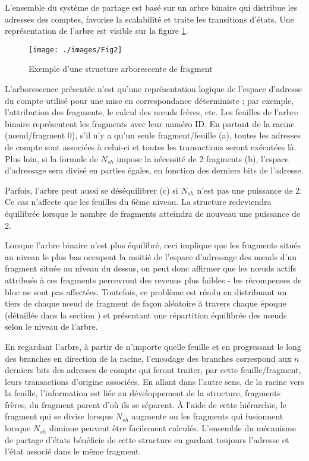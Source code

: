 \documentclass[journal]{IEEEtran}
\begin{document}
L'ensemble du système de partage est basé sur un arbre binaire qui distribue les adresses des comptes, favorise la scalabilité et traite les transitions d'états. Une représentation de l'arbre est visible sur la figure \ref{Fig.2}.

\begin{figure}
	\texttt{[image: ./images/Fig2]} %
	\caption{Exemple d'une structure arborescente de fragment} %
	\label{Fig.2} %
\end{figure}

L'arborescence présentée n'est qu'une représentation logique de l'espace d'adresse du compte utilisé pour une mise en correspondance déterministe ; par exemple, l'attribution des fragments, le calcul des nœuds frères, etc. Les feuilles de l'arbre binaire représentent les fragments avec leur numéro ID. En partant de la racine (nœud/fragment 0), s'il n'y a qu'un seule fragment/feuille (a), toutes les adresses de compte sont associées à celui-ci et toutes les transactions seront exécutées là. Plus loin, si la formule de ${N}_{sh}$ impose la nécessité de 2 fragments (b), l'espace d'adressage sera divisé en parties égales, en fonction des derniers bits de l'adresse.

Parfois, l'arbre peut aussi se déséquilibrer (c) si ${N}_{sh}$ n'est pas une puissance de 2. Ce cas n'affecte que les feuilles du 6ème niveau. La structure redeviendra équilibrée lorsque le nombre de fragments atteindra de nouveau une puissance de 2.

Lorsque l'arbre binaire n’est plus équilibré, ceci implique que les fragments situés au niveau le plus bas occupent la moitié de l'espace d'adressage des nœuds d'un fragment située au niveau du dessus, on peut donc affirmer que les nœuds actifs attribués à ces fragments percevront des revenus plus faibles - les récompenses de bloc ne sont pas affectées. Toutefois, ce problème est résolu en distribuant un tiers de chaque nœud de fragment de façon aléatoire à travers chaque époque (détaillée dans la section ) et présentant une répartition équilibrée des nœuds selon le niveau de l'arbre.

En regardant l'arbre, à partir de n'importe quelle feuille et en progressant le long des branches en direction de la racine, l'encodage des branches correspond aux $n$ derniers bits des adresses de compte qui feront traiter, par cette feuille/fragment, leurs transactions d'origine associées. En allant dans l'autre sens, de la racine vers la feuille, l'information est liée au développement de la structure, fragments frères, du fragment parent d'où ils se séparent. À l'aide de cette hiérarchie, le fragment qui se divise lorsque ${N}_{sh}$ augmente ou les fragments qui fusionnent lorsque ${N}_{sh}$ diminue peuvent être facilement calculés. L'ensemble du mécanisme de partage d'états bénéficie de cette structure en gardant toujours l'adresse et l'état associé dans le même fragment.
\end{document}
